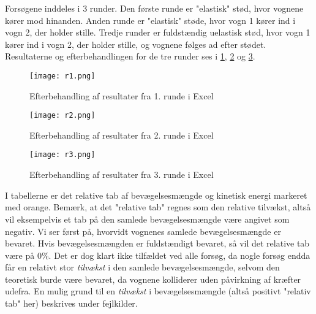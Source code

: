 \documentclass{report}
\begin{document}
Forsøgene inddeles i 3 runder.
Den første runde er "elastisk" stød, hvor vognene kører mod hinanden.
Anden runde er "elastisk" støde, hvor vogn 1 kører ind i vogn 2, der holder stille.
Tredje runder er fuldstændig uelastisk stød, hvor vogn 1 kører ind i vogn 2, der holder stille, og vognene følges ad efter stødet.
Resultaterne og efterbehandlingen for de tre runder ses i \cref{fig:r1}, \cref{fig:r2} og \cref{fig:r3}.
\begin{figure}[H]
\begin{center}
  \texttt{[image: r1.png]}
\end{center}
\caption{Efterbehandling af resultater fra 1. runde i Excel}
\label{fig:r1}
\end{figure}
\begin{figure}[H]
\begin{center}
  \texttt{[image: r2.png]}
\end{center}
\caption{Efterbehandling af resultater fra 2. runde i Excel}
\label{fig:r2}
\end{figure}
\begin{figure}[H]
\begin{center}
  \texttt{[image: r3.png]}
\end{center}
\caption{Efterbehandling af resultater fra 3. runde i Excel}
\label{fig:r3}
\end{figure}
I tabellerne er det relative tab af bevægelsesmængde og kinetisk energi markeret med orange.
Bemærk, at det "relative tab" regnes som den relative tilvækst, altså vil eksempelvis et tab på den samlede bevægelsesmængde være angivet som negativ.
Vi ser først på, hvorvidt vognenes samlede bevægelsesmængde er bevaret. 
Hvis bevægelsesmængden er fuldstændigt bevaret, så vil det relative tab være på $0 \%$.
Det er dog klart ikke tilfældet ved alle forsøg, da nogle forsøg endda får en relativt stor \textit{tilvækst} i den samlede bevægelsesmængde, selvom den teoretisk burde være bevaret, da vognene kolliderer uden påvirkning af kræfter udefra.
En mulig grund til en \textit{tilvækst} i bevægelsesmængde (altså positivt "relativ tab" her) beskrives under fejlkilder.
\end{document}

